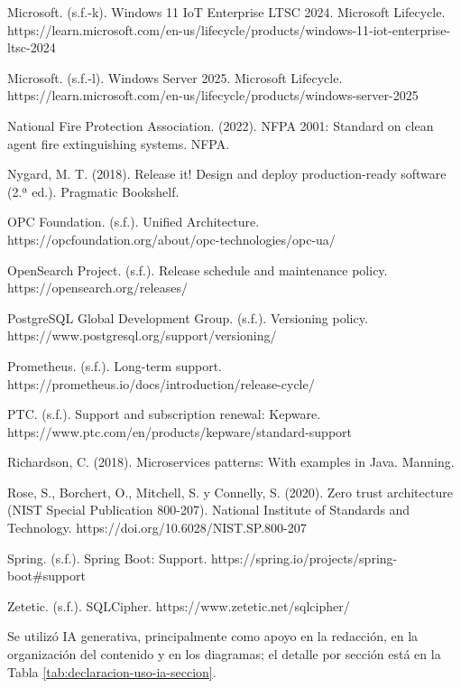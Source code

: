 \documentclass[subdoc]{../../comun/overfore}
\begin{document}
\begin{referencias}
\item Microsoft. (s.f.-k). Windows 11 IoT Enterprise LTSC 2024. Microsoft Lifecycle. https://learn.microsoft.com/en-us/lifecycle/products/windows-11-iot-enterprise-ltsc-2024
\item Microsoft. (s.f.-l). Windows Server 2025. Microsoft Lifecycle. https://learn.microsoft.com/en-us/lifecycle/products/windows-server-2025
\item National Fire Protection Association. (2022). NFPA 2001: Standard on clean agent fire extinguishing systems. NFPA.
\item Nygard, M. T. (2018). Release it! Design and deploy production-ready software (2.ª ed.). Pragmatic Bookshelf.
\item OPC Foundation. (s.f.). Unified Architecture. https://opcfoundation.org/about/opc-technologies/opc-ua/
\item OpenSearch Project. (s.f.). Release schedule and maintenance policy. https://opensearch.org/releases/
\item PostgreSQL Global Development Group. (s.f.). Versioning policy. https://www.postgresql.org/support/versioning/
\item Prometheus. (s.f.). Long-term support. https://prometheus.io/docs/introduction/release-cycle/
\item PTC. (s.f.). Support and subscription renewal: Kepware. https://www.ptc.com/en/products/kepware/standard-support
\item Richardson, C. (2018). Microservices patterns: With examples in Java. Manning.
\item Rose, S., Borchert, O., Mitchell, S. y Connelly, S. (2020). Zero trust architecture (NIST Special Publication 800-207). National Institute of Standards and Technology. https://doi.org/10.6028/NIST.SP.800-207
\item Spring. (s.f.). Spring Boot: Support. https://spring.io/projects/spring-boot\#support
\item Zetetic. (s.f.). SQLCipher. https://www.zetetic.net/sqlcipher/
\end{referencias}

Se utilizó IA generativa, principalmente como apoyo en la redacción, en la organización del contenido y en los diagramas; el detalle por sección está en la Tabla \ref{tab:declaracion-uso-ia-seccion}.
\end{document}
